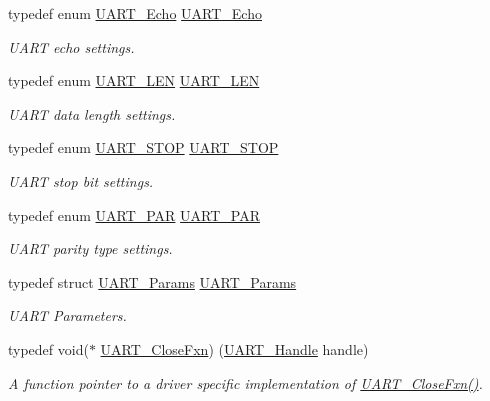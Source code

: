\begin{DoxyCompactItemize}
typedef enum \hyperlink{_u_a_r_t_8h_aac6a03c2e1d76f53e1d9d923dcdc24f2}{U\+A\+R\+T\+\_\+\+Echo} \hyperlink{_u_a_r_t_8h_a5372f2a3d7f68aa38ea560ed5fe520a9}{U\+A\+R\+T\+\_\+\+Echo}
\begin{DoxyCompactList}\small\item\em U\+A\+R\+T echo settings. \end{DoxyCompactList}\item 
typedef enum \hyperlink{_u_a_r_t_8h_adf245d5f10db0abcbd8ad62a0d80c694}{U\+A\+R\+T\+\_\+\+L\+E\+N} \hyperlink{_u_a_r_t_8h_a9290f6d71215e218998106ddff83911b}{U\+A\+R\+T\+\_\+\+L\+E\+N}
\begin{DoxyCompactList}\small\item\em U\+A\+R\+T data length settings. \end{DoxyCompactList}\item 
typedef enum \hyperlink{_u_a_r_t_8h_a176b71ca19bc13d7534fa30fc18c2243}{U\+A\+R\+T\+\_\+\+S\+T\+O\+P} \hyperlink{_u_a_r_t_8h_a7f2ba2e85c63055e158e5e4b51b1f9fd}{U\+A\+R\+T\+\_\+\+S\+T\+O\+P}
\begin{DoxyCompactList}\small\item\em U\+A\+R\+T stop bit settings. \end{DoxyCompactList}\item 
typedef enum \hyperlink{_u_a_r_t_8h_ac70b5aa75500b8c45a51ec560deccfc4}{U\+A\+R\+T\+\_\+\+P\+A\+R} \hyperlink{_u_a_r_t_8h_a12584e934e85933c6b20b59b0ac5c343}{U\+A\+R\+T\+\_\+\+P\+A\+R}
\begin{DoxyCompactList}\small\item\em U\+A\+R\+T parity type settings. \end{DoxyCompactList}\item 
typedef struct \hyperlink{struct_u_a_r_t___params}{U\+A\+R\+T\+\_\+\+Params} \hyperlink{_u_a_r_t_8h_a533d172a10c22e1e5b94e9d0a055d882}{U\+A\+R\+T\+\_\+\+Params}
\begin{DoxyCompactList}\small\item\em U\+A\+R\+T Parameters. \end{DoxyCompactList}\item 
typedef void($\ast$ \hyperlink{_u_a_r_t_8h_ae08ff15291bd6b21cb4e2eb1fce164a6}{U\+A\+R\+T\+\_\+\+Close\+Fxn}) (\hyperlink{_u_a_r_t_8h_a13cc669fae768d8212e6491ce71b28af}{U\+A\+R\+T\+\_\+\+Handle} handle)
\begin{DoxyCompactList}\small\item\em A function pointer to a driver specific implementation of \hyperlink{_u_a_r_t_8h_ae08ff15291bd6b21cb4e2eb1fce164a6}{U\+A\+R\+T\+\_\+\+Close\+Fxn()}. \end{DoxyCompactList}\item 

\end{DoxyCompactItemize}
